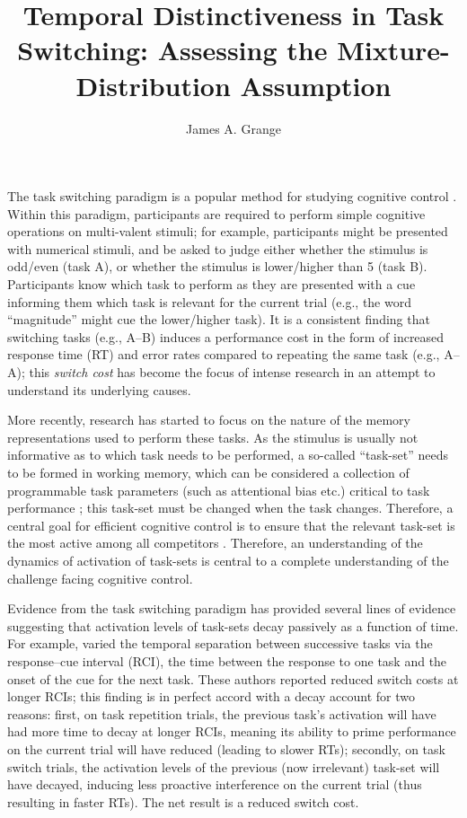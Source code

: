 \documentclass[a4paper, jou, natbib]{apa6}
\title{Temporal Distinctiveness in Task Switching: Assessing the Mixture-Distribution Assumption}
\author{James A. Grange}
\affiliation{School of Psychology, Keele University, UK}
\begin{document}
\maketitle

The task switching paradigm is a popular method for studying cognitive control \citep{Grange2014a, Kiesel2010, Vandierendonck2010}. Within this paradigm, participants are required to perform simple cognitive operations on multi-valent stimuli; for example, participants might be presented with numerical stimuli, and be asked to judge either whether the stimulus is odd/even (task A), or whether the stimulus is lower/higher than 5 (task B). Participants know which task to perform as they are presented with a cue informing them which task is relevant for the current trial (e.g., the word ``magnitude'' might cue the lower/higher task). It is a consistent finding that switching tasks (e.g., A--B) induces a performance cost in the form of increased response time (RT) and error rates compared to repeating the same task (e.g., A--A); this \emph{switch cost} has become the focus of intense research in an attempt to understand its underlying causes. 

More recently, research has started to focus on the nature of the memory representations used to perform these tasks. As the stimulus is usually not informative as to which task needs to be performed, a so-called ``task-set'' needs to be formed in working memory, which can be considered a collection of programmable task parameters (such as attentional bias etc.) critical to task performance \citep{Logan2001}; this task-set must be changed when the task changes. Therefore, a central goal for efficient cognitive control is to ensure that the relevant task-set is the most active among all competitors \citep[e.g.,][]{Altmann2008}. Therefore, an understanding of the dynamics of activation of task-sets is central to a complete understanding of the challenge facing cognitive control.

Evidence from the task switching paradigm has provided several lines of evidence suggesting that activation levels of task-sets decay passively as a function of time. For example, \cite{Meiran2000a} varied the temporal separation between successive tasks via the response--cue interval (RCI), the time between the response to one task and the onset of the cue for the next task. These authors reported reduced switch costs at longer RCIs; this finding is in perfect accord with a decay account for two reasons: first, on task repetition trials, the previous task's activation will have had more time to decay at longer RCIs, meaning its ability to prime performance on the current trial will have reduced (leading to slower RTs); secondly, on task switch trials, the activation levels of the previous (now irrelevant) task-set will have decayed, inducing less proactive interference on the current trial (thus resulting in faster RTs). The net result is a reduced switch cost.
\end{document}
